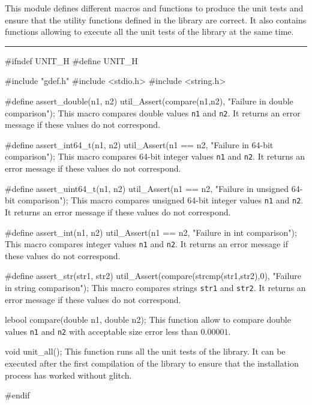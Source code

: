 
This module defines different macros and functions to produce the unit tests and ensure that the utility functions defined in the library are correct. It also contains functions allowing to execute all the unit tests of the library at the same time.

\bigskip
\hrule
\code
\hide
#ifndef UNIT_H
#define UNIT_H
\endhide

#include "gdef.h"
#include <stdio.h>
#include <string.h>

#define assert_double(n1, n2) util_Assert(compare(n1,n2), "Failure in double comparison");
\endcode
 \tab  This macro compares double values {\tt n1} and {\tt n2}. It returns an error message if these values do not correspond.
 \endtab
\code

#define assert_int64_t(n1, n2) util_Assert(n1 == n2, "Failure in 64-bit comparison");
\endcode
 \tab  This macro compares 64-bit integer values {\tt n1} and {\tt n2}. It returns an error message if these values do not correspond.
 \endtab
\code

#define assert_uint64_t(n1, n2) util_Assert(n1 == n2, "Failure in unsigned 64-bit comparison");
\endcode
 \tab  This macro compares unsigned 64-bit integer values {\tt n1} and {\tt n2}. It returns an error message if these values do not correspond.
 \endtab
\code

#define assert_int(n1, n2) util_Assert(n1 == n2, "Failure in int comparison");
\endcode
 \tab  This macro compares integer values {\tt n1} and {\tt n2}. It returns an error message if these values do not correspond.
 \endtab
\code

#define assert_str(str1, str2) util_Assert(compare(strcmp(str1,str2),0), "Failure in string comparison");
\endcode
 \tab  This macro compares strings {\tt str1} and {\tt str2}. It returns an error message if these values do not correspond.
 \endtab
\code

lebool compare(double n1, double n2);
\endcode
 \tab  This function allow to compare double values {\tt n1} and {\tt n2} with acceptable size error less than $0.00001$.
 \endtab
\code

void unit_all();
\endcode
 \tab  This function runs all the unit tests of the library. It can be executed after the first compilation of the library to ensure that the installation process has worked without glitch.
 \endtab
\code

\hide
#endif
\endhide
\endcode
